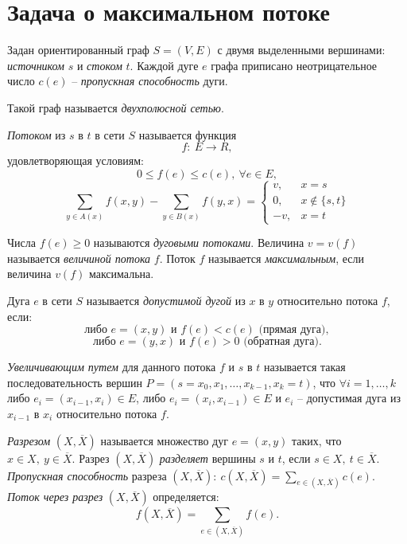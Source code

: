 \section{Задача о максимальном потоке}

\begin{definition}
	Задан ориентированный граф $S = (V,E)$ с двумя выделенными вершинами: \emph{источником} $s$ и \emph{стоком} $t$. Каждой дуге $e$ графа приписано неотрицательное число $c(e)$ -- \emph{пропускная способность} дуги.

	Такой граф называется \emph{двухполюсной сетью}.
\end{definition}

\begin{definition}
	\emph{Потоком} из $s$ в $t$ в сети $S$ называется функция
	\[
		f: \ E \rightarrow R,
	\]
	удовлетворяющая условиям:
	\[
		0 \leqslant f(e) \leqslant c(e), \ \forall e \in E,
	\]
	\[
		\sum_{y \in A(x)} f(x,y) - \sum_{y \in B(x)} f(y,x) = \left\{\begin{array}{ll}
			v,  & x = s            \\
			0,  & x \notin \{s,t\} \\
			-v, & x = t
		\end{array}\right.
	\]


	Числа $f(e) \geqslant 0$ называются \emph{дуговыми потоками}. Величина $v = v(f)$ называется \emph{величиной потока} $f$. Поток $f$ называется \emph{максимальным}, если величина $v(f)$ максимальна.
\end{definition}

\begin{definition}
	Дуга $e$ в сети $S$ называется \emph{допустимой дугой} из $x$ в $y$ относительно потока $f$, если:
	\[
		\text{либо }e = (x,y) \text{ и } f(e) < c(e) \text{ (прямая дуга)},
	\]
	\[
		\text{либо }e = (y,x) \text{ и } f(e) > 0 \text{ (обратная дуга)}.
	\]

	\emph{Увеличивающим путем} для данного потока $f$ и $s$ в $t$ называется такая последовательность вершин $P = (s = x_0,x_1,\ldots ,x_{k-1},x_k = t)$, что $\forall i = 1,\ldots ,k$ либо $e_i = (x_{i-1} ,x_i) \in E$, либо $e_i = (x_i,x_{i-1} )\in E$ и $e_i$ -- допустимая дуга из $x_{i-1} $ в $x_i$ относительно потока $f$.
\end{definition}

\begin{definition}[Разрез]
	\emph{Разрезом} $(X,\overline{X} )$ называется множество дуг $e = (x,y)$ таких, что $x \in X, \ y \in \overline{X} $. Разрез $(X,\overline{X} )$ \emph{разделяет} вершины $s$ и $t$, если $s \in X, \ t \in \overline{X} $. \emph{Пропускная способность} разреза $(X,\overline{X} ): \ c(X,\overline{X} ) = \sum_{e \in (X,\overline{X} )} c(e)$. \emph{Поток через разрез} $(X,\overline{X} )$ определяется:
	\[
		f(X,\overline{X} ) = \sum_{e \in (X,\overline{X} )} f(e).
	\]
\end{definition}

